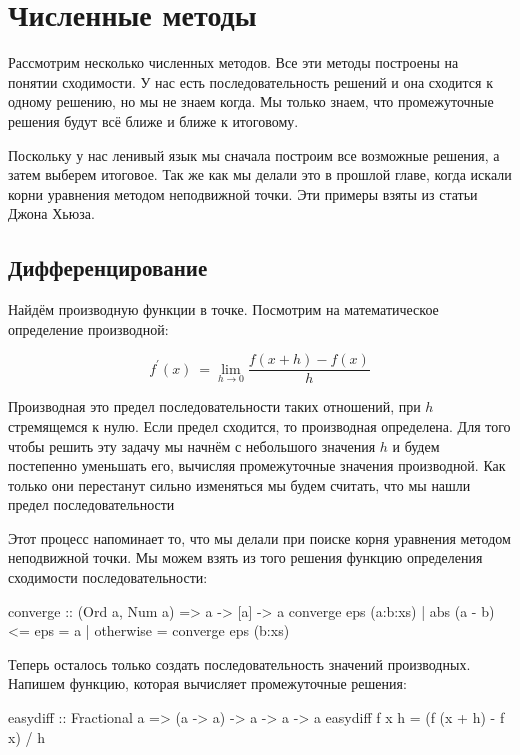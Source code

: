 \section{Численные методы}

Рассмотрим несколько численных методов. 
Все эти методы построены на понятии сходимости.
У нас есть последовательность решений и она
сходится к одному решению, но мы не знаем когда. 
Мы только знаем, что промежуточные решения будут всё 
ближе и ближе к итоговому. 

Поскольку у нас ленивый язык мы сначала построим
все возможные решения, а затем выберем итоговое.
Так же как мы делали это в прошлой главе, когда
искали корни уравнения методом неподвижной точки.
Эти примеры взяты из статьи 
 Джона Хьюза.

\subsection{Дифференцирование}

Найдём производную функции в точке. Посмотрим на 
математическое определение производной:

\[ f^\prime(x)\ =\lim_{h\to0}\frac{f(x+h)-f(x)}{h}  \]

Производная это предел последовательности таких
отношений, при $h$ стремящемся к нулю. Если предел
сходится, то производная определена. Для того
чтобы решить эту задачу мы начнём с небольшого 
значения $h$ и будем постепенно уменьшать его,
вычисляя промежуточные значения производной.
Как только они перестанут сильно изменяться мы 
будем считать, что мы нашли предел последовательности

Этот процесс напоминает то, что мы делали при
поиске корня уравнения методом неподвижной  точки.
Мы можем взять из того решения функцию определения 
сходимости последовательности:

\begin{code}
converge :: (Ord a, Num a) => a -> [a] -> a
converge eps (a:b:xs) 
    | abs (a - b) <= eps    = a
    | otherwise             = converge eps (b:xs)
\end{code}

Теперь осталось только создать последовательность
значений производных. Напишем функцию, которая вычисляет
промежуточные решения:

\begin{code}
easydiff :: Fractional a => (a -> a) -> a -> a -> a
easydiff f x h = (f (x + h) - f x) / h
\end{code}

